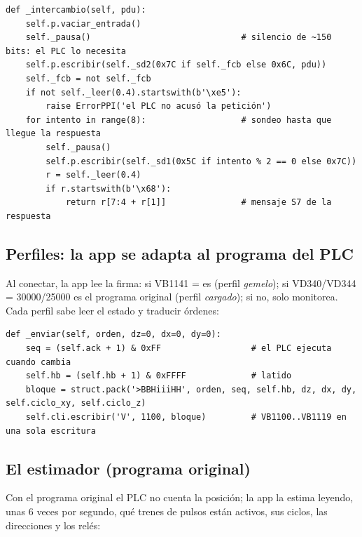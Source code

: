 \documentclass[a4paper,11pt]{article}
\begin{document}
\begin{lstlisting}[style=py, caption={Núcleo del intercambio (\texttt{ppi.py}).}]
def _intercambio(self, pdu):
    self.p.vaciar_entrada()
    self._pausa()                              # silencio de ~150 bits: el PLC lo necesita
    self.p.escribir(self._sd2(0x7C if self._fcb else 0x6C, pdu))
    self._fcb = not self._fcb
    if not self._leer(0.4).startswith(b'\xe5'):
        raise ErrorPPI('el PLC no acusó la petición')
    for intento in range(8):                   # sondeo hasta que llegue la respuesta
        self._pausa()
        self.p.escribir(self._sd1(0x5C if intento % 2 == 0 else 0x7C))
        r = self._leer(0.4)
        if r.startswith(b'\x68'):
            return r[7:4 + r[1]]               # mensaje S7 de la respuesta
\end{lstlisting}

\subsection{Perfiles: la app se adapta al programa del PLC}
Al conectar, la app lee la firma: si VB1141 =  es  (perfil \emph{gemelo}); si VD340/VD344 = 30000/25000 es el programa original (perfil \emph{cargado}); si no, solo monitorea. Cada perfil sabe leer el estado y traducir órdenes:

\begin{lstlisting}[style=py, caption={Envío de una orden al buzón del programa del gemelo (\texttt{brazo.py}).}]
def _enviar(self, orden, dz=0, dx=0, dy=0):
    seq = (self.ack + 1) & 0xFF                  # el PLC ejecuta cuando cambia
    self.hb = (self.hb + 1) & 0xFFFF             # latido
    bloque = struct.pack('>BBHiiiHH', orden, seq, self.hb, dz, dx, dy, self.ciclo_xy, self.ciclo_z)
    self.cli.escribir('V', 1100, bloque)         # VB1100..VB1119 en una sola escritura
\end{lstlisting}

\subsection{El estimador (programa original)}\label{sec:estimador}
Con el programa original el PLC no cuenta la posición; la app la estima leyendo, unas 6 veces por segundo, qué trenes de pulsos están activos, sus ciclos, las direcciones y los relés:
\end{document}
